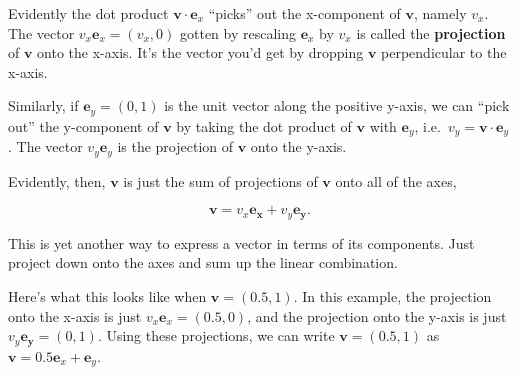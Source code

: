 \documentclass[
  letterpaper,
  DIV=11,
  numbers=noendperiod]{scrreprt}
\begin{document}
Evidently the dot product \(\mathbf{v} \cdot \mathbf{e}_x\) ``picks''
out the x-component of \(\mathbf{v}\), namely \(v_x\). The vector
\(v_x \mathbf{e}_x = (v_x,0)\) gotten by rescaling \(\mathbf{e}_x\) by
\(v_x\) is called the \textbf{projection} of \(\mathbf{v}\) onto the
x-axis. It's the vector you'd get by dropping \(\mathbf{v}\)
perpendicular to the x-axis.

Similarly, if \(\mathbf{e}_y = (0,1)\) is the unit vector along the
positive y-axis, we can ``pick out'' the y-component of \(\mathbf{v}\)
by taking the dot product of \(\mathbf{v}\) with \(\mathbf{e}_y\),
i.e.~\(v_y = \mathbf{v} \cdot \mathbf{e}_y\). The vector
\(v_y\mathbf{e}_y\) is the projection of \(\mathbf{v}\) onto the y-axis.

Evidently, then, \(\mathbf{v}\) is just the sum of projections of
\(\mathbf{v}\) onto all of the axes,

\[\mathbf{v} = v_x \mathbf{e_x} + v_y \mathbf{e_y}.\]

This is yet another way to express a vector in terms of its components.
Just project down onto the axes and sum up the linear combination.

Here's what this looks like when \(\mathbf{v}=(0.5,1)\). In this
example, the projection onto the x-axis is just
\(v_x \mathbf{e}_x=(0.5, 0)\), and the projection onto the y-axis is
just \(v_y \mathbf{e_y}=(0,1)\). Using these projections, we can write
\(\mathbf{v}=(0.5,1)\) as
\(\mathbf{v} = 0.5 \mathbf{e}_x + \mathbf{e}_y\).
\end{document}
